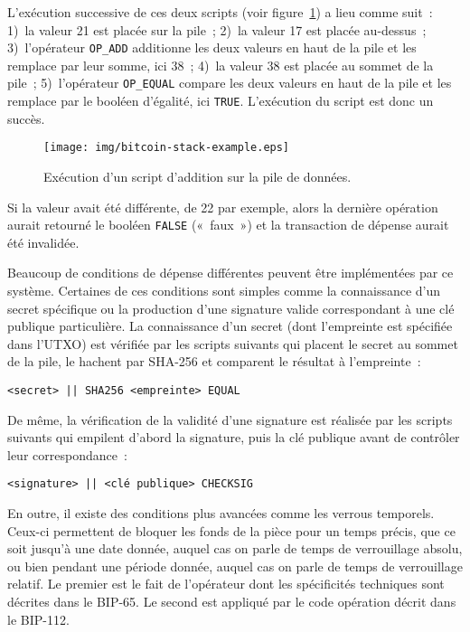 L'exécution successive de ces deux scripts (voir figure~\ref{fig:bitcoin-stack}) a lieu comme suit~: 1)~la valeur 21 est placée sur la pile~; 2)~la valeur 17 est placée au-dessus~; 3)~l'opérateur \texttt{OP\_ADD} additionne les deux valeurs en haut de la pile et les remplace par leur somme, ici 38~; 4)~la valeur 38 est placée au sommet de la pile~; 5)~l'opérateur \texttt{OP\_EQUAL} compare les deux valeurs en haut de la pile et les remplace par le booléen d'égalité, ici \texttt{TRUE}. L'exécution du script est donc un succès.

\begin{figure}[ht]
  \centering
  \texttt{[image: img/bitcoin-stack-example.eps]}
  \caption{Exécution d'un script d'addition sur la pile de données.}
  \label{fig:bitcoin-stack}
\end{figure}

Si la valeur avait été différente, de 22 par exemple, alors la dernière opération aurait retourné le booléen \texttt{FALSE} («~faux~») et la transaction de dépense aurait été invalidée.


Beaucoup de conditions de dépense différentes peuvent être implémentées par ce système. Certaines de ces conditions sont simples comme la connaissance d'un secret spécifique ou la production d'une signature valide correspondant à une clé publique particulière. La connaissance d'un secret (dont l'empreinte est spécifiée dans l'UTXO) est vérifiée par les scripts suivants qui placent le secret au sommet de la pile, le hachent par SHA-256 et comparent le résultat à l'empreinte~:

\begin{Verbatim}[fontsize=\footnotesize]
<secret> || SHA256 <empreinte> EQUAL
\end{Verbatim}

De même, la vérification de la validité d'une signature est réalisée par les scripts suivants qui empilent d'abord la signature, puis la clé publique avant de contrôler leur correspondance~:

\begin{Verbatim}[fontsize=\footnotesize]
<signature> || <clé publique> CHECKSIG
\end{Verbatim}

En outre, il existe des conditions plus avancées comme les verrous temporels. Ceux-ci permettent de bloquer les fonds de la pièce pour un temps précis, que ce soit jusqu'à une date donnée, auquel cas on parle de temps de verrouillage absolu, ou bien pendant une période donnée, auquel cas on parle de temps de verrouillage relatif. Le premier est le fait de l'opérateur  dont les spécificités techniques sont décrites dans le BIP-65. Le second est appliqué par le code opération  décrit dans le BIP-112.

